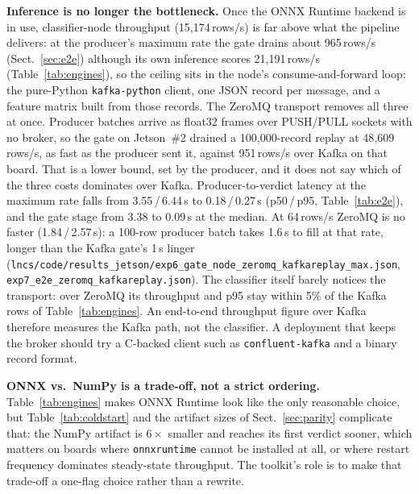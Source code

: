 \documentclass[runningheads]{llncs}
\begin{document}
\textbf{Inference is no longer the bottleneck.} Once the ONNX Runtime backend is in use, classifier-node throughput (15{,}174\,rows/s) is far above what the pipeline delivers: at the producer's maximum rate the gate drains about 965\,rows/s (Sect.~\ref{sec:e2e}) although its own inference scores 21{,}191\,rows/s (Table~\ref{tab:engines}), so the ceiling sits in the node's consume-and-forward loop: the pure-Python \texttt{kafka-python} client, one JSON record per message, and a feature matrix built from those records. The ZeroMQ transport removes all three at once. Producer batches arrive as float32 frames over PUSH/PULL sockets with no broker, so the gate on Jetson~\#2 drained a 100{,}000-record replay at 48{,}609\,rows/s, as fast as the producer sent it, against 951\,rows/s over Kafka on that board. That is a lower bound, set by the producer, and it does not say which of the three costs dominates over Kafka. Producer-to-verdict latency at the maximum rate falls from 3.55\,/\,6.44\,s to 0.18\,/\,0.27\,s (p50\,/\,p95, Table~\ref{tab:e2e}), and the gate stage from 3.38 to 0.09\,s at the median. At 64\,rows/s ZeroMQ is no faster (1.84\,/\,2.57\,s): a 100-row producer batch takes 1.6\,s to fill at that rate, longer than the Kafka gate's 1\,s linger (\texttt{lncs/code/results\_jetson/exp6\_gate\_node\_zeromq\_\allowbreak kafkareplay\_max.json}, \texttt{exp7\_e2e\_zeromq\_kafkareplay.json}). The classifier itself barely notices the transport: over ZeroMQ its throughput and p95 stay within 5\% of the Kafka rows of Table~\ref{tab:engines}. An end-to-end throughput figure over Kafka therefore measures the Kafka path, not the classifier. A deployment that keeps the broker should try a C-backed client such as \texttt{confluent-kafka} and a binary record format.

\textbf{ONNX vs.\ NumPy is a trade-off, not a strict ordering.} Table~\ref{tab:engines} makes ONNX Runtime look like the only reasonable choice, but Table~\ref{tab:coldstart} and the artifact sizes of Sect.~\ref{sec:parity} complicate that: the NumPy artifact is $6\times$ smaller and reaches its first verdict sooner, which matters on boards where \texttt{onnxruntime} cannot be installed at all, or where restart frequency dominates steady-state throughput. The toolkit's role is to make that trade-off a one-flag choice rather than a rewrite.
\end{document}
